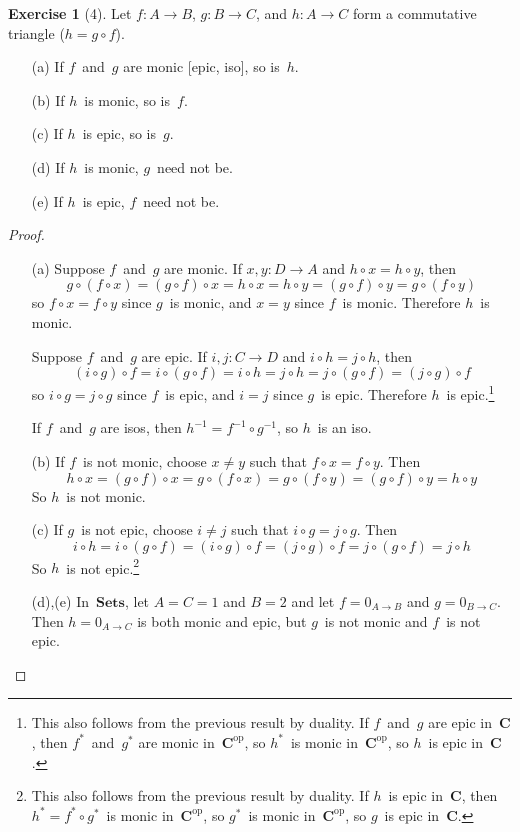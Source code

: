 \documentclass[letterpaper,12pt]{article}
\newcommand{\Sets}{\mathbf{Sets}}
\newcommand{\after}{\circ}
\newcommand{\inv}[1]{#1^{-1}}
\renewcommand{\star}[1]{#1^{*}}
\newcommand{\cat}[1]{\mathbf{#1}}
\newcommand{\dual}[1]{#1^{\mathrm{op}}}
\theoremstyle{definition}
\newtheorem*{exer}{Exercise}
\theoremstyle{remark}
\theoremstyle{direction}
\begin{document}
\begin{exer}[4]
Let \(f:A\to B\), \(g:B\to C\), and \(h:A\to C\) form a commutative triangle (\(h=g\after f\)).
\begin{enumerate}[itemsep=0pt]
\item[(a)] If \(f\)~and~\(g\) are monic [epic, iso], so is~\(h\).
\item[(b)] If \(h\)~is monic, so is~\(f\).
\item[(c)] If \(h\)~is epic, so is~\(g\).
\item[(d)] If \(h\)~is monic, \(g\)~need not be.
\item[(e)] If \(h\)~is epic, \(f\)~need not be.
\end{enumerate}
\begin{proof}\
\begin{enumerate}[itemsep=0pt]
\item[(a)] Suppose \(f\)~and~\(g\) are monic. If \(x,y:D\to A\) and \(h\after x=h\after y\), then
\[g\after(f\after x)=(g\after f)\after x=h\after x=h\after y=(g\after f)\after y=g\after(f\after y)\]
so \(f\after x=f\after y\) since \(g\)~is monic, and \(x=y\) since \(f\)~is monic. Therefore \(h\)~is monic.

Suppose \(f\)~and~\(g\) are epic. If \(i,j:C\to D\) and \(i\after h=j\after h\), then
\[(i\after g)\after f=i\after (g\after f)=i\after h=j\after h=j\after(g\after f)=(j\after g)\after f\]
so \(i\after g=j\after g\) since \(f\)~is epic, and \(i=j\) since \(g\)~is epic. Therefore \(h\)~is epic.\footnote{This also follows from the previous result by duality. If \(f\)~and~\(g\) are epic in~\(\cat{C}\), then \(\star{f}\)~and~\(\star{g}\) are monic in~\(\dual{\cat{C}}\), so \(\star{h}\)~is monic in~\(\dual{\cat{C}}\), so \(h\)~is epic in~\(\cat{C}\).}

If \(f\)~and~\(g\) are isos, then \(\inv{h}=\inv{f}\after\inv{g}\), so \(h\)~is an iso.
\item[(b)] If \(f\)~is not monic, choose \(x\ne y\) such that \(f\after x=f\after y\). Then
\[h\after x=(g\after f)\after x=g\after(f\after x)=g\after(f\after y)=(g\after f)\after y=h\after y\]
So \(h\)~is not monic.
\item[(c)] If \(g\)~is not epic, choose \(i\ne j\) such that \(i\after g=j\after g\). Then
\[i\after h=i\after(g\after f)=(i\after g)\after f=(j\after g)\after f=j\after(g\after f)=j\after h\]
So \(h\)~is not epic.\footnote{This also follows from the previous result by duality. If \(h\)~is epic in~\(\cat{C}\), then \(\star{h}=\star{f}\after\star{g}\)~is monic in~\(\dual{\cat{C}}\), so \(\star{g}\)~is monic in~\(\dual{\cat{C}}\), so \(g\)~is epic in~\(\cat{C}\).}
\item[(d),(e)] In~\(\Sets\), let \(A=C=1\) and \(B=2\) and let \(f=0_{A\to B}\) and \(g=0_{B\to C}\). Then \(h=0_{A\to C}\) is both monic and epic, but \(g\)~is not monic and \(f\)~is not epic.\qedhere
\end{enumerate}
\end{proof}
\end{exer}
\end{document}
